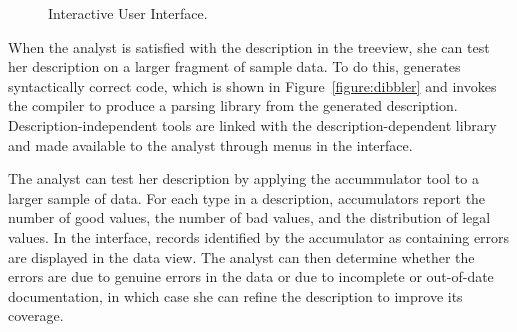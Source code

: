 \begin{figure}
  \begin{center}
  \end{center}
\caption{\label{figure:launchpads}\launchpads{} Interactive User Interface.\vspace{-1cm}}
\end{figure}

When the analyst is satisfied with the description in the treeview,
she can test her description on a larger fragment of sample data.  To
do this, \launchpads{} generates syntactically correct \pads{} code,
which is shown in Figure~\ref{figure:dibbler}
and invokes the \pads{} compiler to produce a parsing library from the
generated description.  Description-independent tools are linked with
the description-dependent library and made available to the analyst
through menus in the \launchpads{} interface.  

The analyst can test her description by applying the accummulator tool
to a larger sample of data.  For each type in a \pads{} description,
accumulators report the number of good values, the number of bad
values, and the distribution of legal values.  In the \launchpads{}
interface, records identified by the accumulator as containing errors
are displayed in the data view.  The analyst can then determine
whether the errors are due to genuine errors in the data or due to
incomplete or out-of-date documentation, in which case she can refine
the description to improve its coverage.

